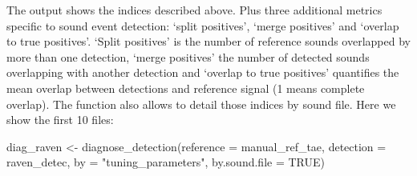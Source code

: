 \documentclass[
]{article}
\newenvironment{Shaded}{\begin{snugshade}}{\end{snugshade}}
\newcommand{\AttributeTok}[1]{\textcolor[rgb]{0.77,0.63,0.00}{#1}}
\newcommand{\ConstantTok}[1]{\textcolor[rgb]{0.00,0.00,0.00}{#1}}
\newcommand{\FunctionTok}[1]{\textcolor[rgb]{0.00,0.00,0.00}{#1}}
\newcommand{\NormalTok}[1]{#1}
\newcommand{\OtherTok}[1]{\textcolor[rgb]{0.56,0.35,0.01}{#1}}
\newcommand{\StringTok}[1]{\textcolor[rgb]{0.31,0.60,0.02}{#1}}
\begin{document}
The output shows the indices described above. Plus three additional
metrics specific to sound event detection: `split positives', `merge
positives' and `overlap to true positives'. `Split positives' is the
number of reference sounds overlapped by more than one detection, `merge
positives' the number of detected sounds overlapping with another
detection and `overlap to true positives' quantifies the mean overlap
between detections and reference signal (1 means complete overlap). The
function also allows to detail those indices by sound file. Here we show
the first 10 files:

\begin{Shaded}
\begin{Highlighting}[]
\NormalTok{diag\_raven }\OtherTok{\textless{}{-}} \FunctionTok{diagnose\_detection}\NormalTok{(}\AttributeTok{reference =}\NormalTok{ manual\_ref\_tae, }\AttributeTok{detection =}\NormalTok{ raven\_detec, }\AttributeTok{by =} \StringTok{"tuning\_parameters"}\NormalTok{, }\AttributeTok{by.sound.file =} \ConstantTok{TRUE}\NormalTok{)}
\end{Highlighting}
\end{Shaded}
\end{document}
